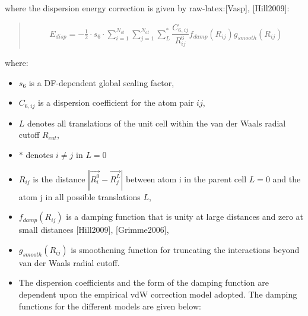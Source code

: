\documentclass[letterpaper,10pt,english]{sphinxmanual}
\begin{document}
where the dispersion energy correction is given by
raw-latex:{[}Vasp{]}, {[}Hill2009{]}:
\begin{quote}
\label{\detokenize{VDW-correction:equation-e-disp}}\begin{equation}\label{equation:VDW-correction:E_disp}
\begin{split}  E_{disp} = -\frac{1}{2}\cdot s_6\cdot \sum^{N_{at}}_{i=1} \sum^{N_{at}}_{j=1}
\sum_{L}^* \dfrac{C_{6,ij}}{R^6_{ij}} f_{damp}( R_{ij} ) g_{smooth}(R_{ij})\end{split}
\end{equation}\end{quote}

where:
\begin{itemize}
\item {} 
\(s_6\) is a DF-dependent global scaling factor,

\item {} 
\(C_{6,ij}\) is a dispersion coefficient for the atom pair
\(ij\),

\item {} 
\(L\) denotes all translations of the unit cell within the van
der Waals radial cutoff \(R_{cut}\),

\item {} 
\(*\) denotes \(i\ne j\) in \(L=0\)

\item {} 
\(R_{ij}\) is the distance \(| \overrightarrow{R^{0}_{i}} -
\overrightarrow{R^L_{j}} |\) between atom i in the parent cell
\(L=0\) and the atom j in all possible translations \(L\),

\item {} 
\(f_{damp}(R_{ij})\) is a damping function that is unity at large
distances and zero at small
distances {[}Hill2009{]}, {[}Grimme2006{]},

\item {} 
\(g_{smooth}(R_{ij})\) is smoothening function for truncating the
interactions beyond van der Waals radial cutoff.

\item {} 
The dispersion coefficients and the form of the damping function are
dependent upon the empirical vdW correction model adopted. The
damping functions for the different models are given below:

\end{itemize}
\end{document}
